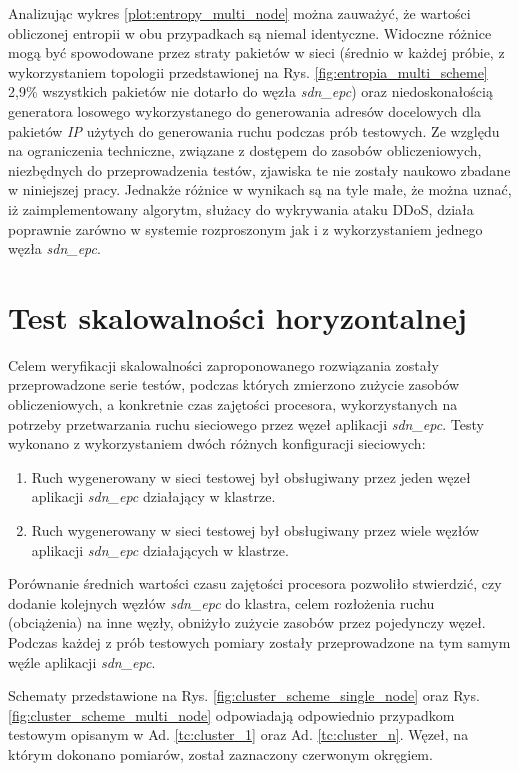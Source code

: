 Analizując wykres \ref{plot:entropy_multi_node} można zauważyć, że wartości
obliczonej entropii w obu przypadkach są niemal identyczne. Widoczne różnice
mogą być spowodowane przez straty pakietów w sieci (średnio w każdej próbie, z
wykorzystaniem topologii przedstawionej na Rys. \ref{fig:entropia_multi_scheme}
2,9\% wszystkich pakietów nie dotarło do węzła \textit{sdn\_epc}) oraz
niedoskonałością generatora losowego wykorzystanego do generowania adresów
docelowych dla pakietów \textit{IP} użytych do generowania ruchu podczas prób
testowych. Ze względu na ograniczenia techniczne, związane z dostępem do zasobów
obliczeniowych, niezbędnych do przeprowadzenia testów, zjawiska te nie zostały
naukowo zbadane w niniejszej pracy. Jednakże różnice w wynikach są  na tyle
małe, że można uznać, iż zaimplementowany algorytm, służacy do wykrywania ataku
DDoS, działa poprawnie zarówno w systemie rozproszonym jak i z wykorzystaniem
jednego węzła \textit{sdn\_epc}.

\section{Test skalowalności horyzontalnej}

Celem weryfikacji skalowalności zaproponowanego rozwiązania zostały
przeprowadzone serie testów, podczas których zmierzono zużycie zasobów
obliczeniowych, a konkretnie czas zajętości procesora, wykorzystanych na
potrzeby przetwarzania ruchu sieciowego przez węzeł aplikacji \textit{sdn\_epc}.
Testy wykonano z wykorzystaniem dwóch różnych konfiguracji sieciowych:
\begin{enumerate}
  \item \label{tc:cluster_1} Ruch wygenerowany w sieci testowej był obsługiwany
    przez jeden węzeł aplikacji \textit{sdn\_epc} działający w klastrze.
  \item \label{tc:cluster_n} Ruch wygenerowany w sieci testowej był obsługiwany
    przez wiele węzłów aplikacji \textit{sdn\_epc} działających w klastrze.
\end{enumerate}

Porównanie średnich wartości czasu zajętości procesora pozwoliło stwierdzić,
czy dodanie kolejnych węzłów \textit{sdn\_epc} do klastra, celem rozłożenia
ruchu (obciążenia) na inne węzły, obniżyło zużycie zasobów przez pojedynczy
węzeł. Podczas każdej z prób testowych pomiary zostały przeprowadzone na tym
samym węźle aplikacji \textit{sdn\_epc}.

Schematy przedstawione na Rys. \ref{fig:cluster_scheme_single_node} oraz
Rys. \ref{fig:cluster_scheme_multi_node} odpowiadają odpowiednio przypadkom
testowym opisanym w Ad. \ref{tc:cluster_1} oraz Ad. \ref{tc:cluster_n}. Węzeł,
na którym dokonano pomiarów, został zaznaczony czerwonym okręgiem.
\newpage

